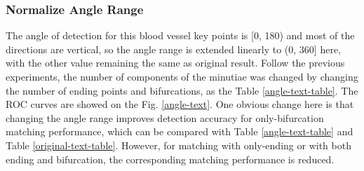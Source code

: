 \subsubsection{Normalize Angle Range}
The angle of detection for this blood vessel key points is [0, 180) and most of the directions are vertical, so the angle range is extended linearly to (0, 360] here, with the other value remaining the same as original result. Follow the previous experiments, the number of components of the minutiae was changed by changing the number of ending points and bifurcations, as the Table \ref{angle-text-table}. The ROC curves are showed on the Fig. \ref{angle-text}. One obvious change here is that changing the angle range improves detection accuracy for only-bifurcation matching performance, which can be compared with Table \ref{angle-text-table} and Table \ref{original-text-table}. However, for matching with only-ending or with both ending and bifurcation, the corresponding matching performance is reduced.

